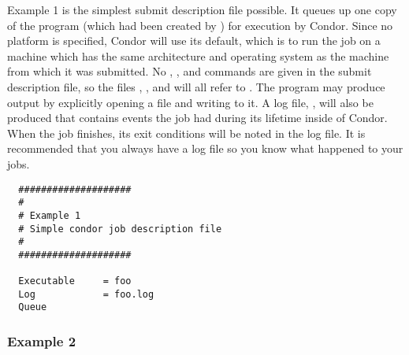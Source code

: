 Example 1 is the simplest submit description
file possible. It queues up one copy of the program (which had been
created by ) for execution
by Condor.
Since no platform is specified, Condor will use its default,
which is to run the job on a machine which has the
same architecture and operating system as the machine from which it was
submitted. 
No 
,
, and
commands are given in the submit
description file, so the
files , , and  will all refer to 
.
The program may produce output by explicitly opening a file and writing to
it.
A log file, , will also be produced that contains events
the job had during its lifetime inside of Condor.
When the job finishes, its exit conditions will be noted in the log file.
It is recommended that you always have a log file so you know what
happened to your jobs.
\begin{verbatim}
  ####################                                                    
  # 
  # Example 1                                                            
  # Simple condor job description file                                    
  #                                                                       
  ####################                                                    
                                                                          
  Executable     = foo                                                    
  Log            = foo.log                                                    
  Queue    
\end{verbatim}

\subsubsection{Example 2}

